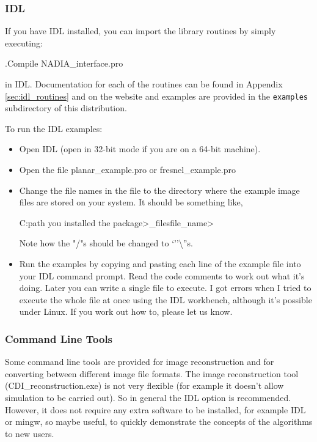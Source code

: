 \documentclass[]{nadia}
\begin{document}
\subsubsection{IDL}
If you have IDL installed, you can import the library routines by
simply executing:
\begin{myverbatim}
   .Compile NADIA_interface.pro
\end{myverbatim}
in IDL. Documentation for each of the routines can be found in
Appendix \ref{sec:idl_routines} and on the website and examples are
provided in the {\tt examples} subdirectory of this distribution.

To run the IDL examples:
\begin{itemize}
\item Open IDL (open in 32-bit mode if you are on a 64-bit machine).
\item Open the file planar\_example.pro or fresnel\_example.pro
\item Change the file names in the file to the directory where the
  example image files are stored on your system. It should be
  something like,
  \begin{myverbatim}
    C:\<path you installed the package>\NADIA\examples\image_files\<file_name>
  \end{myverbatim}
     Note how the "/"s should be changed to `''\textbackslash''s.
   \item Run the examples by copying and pasting each line of the
     example file into your IDL command prompt. Read the code comments
     to work out what it's doing. Later you can write a single file to
     execute. I got errors when I tried to execute the whole file at
     once using the IDL workbench, although it's possible under
     Linux. If you work out how to, please let us know.
\end{itemize}


\subsubsection{Command Line Tools}

Some command line tools are provided for image reconstruction and for
converting between different image file formats. The image
reconstruction tool (CDI\_reconstruction.exe) is not very flexible
(for example it doesn't allow simulation to be carried out). So in
general the IDL option is recommended.  However, it does not require
any extra software to be installed, for example IDL or mingw, so maybe
useful, to quickly demonstrate the concepts of the algorithms to new
users.
\end{document}
